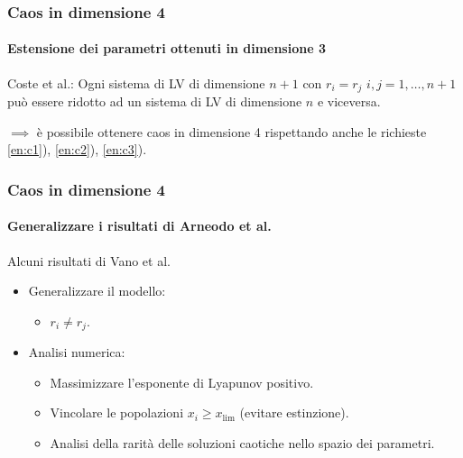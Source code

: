 \begin{frame}
\frametitle{Caos in dimensione 4}
\framesubtitle{Estensione dei parametri ottenuti in dimensione 3}
\begin{block}{Coste et al.:}
Ogni sistema di LV di dimensione $n+1$ con $r_i = r_j$ $i, j = 1, \ldots, n+1$ può essere ridotto ad un sistema di LV di dimensione $n$ e viceversa.
\end{block}
\vspace{1em}
$\implies$ è possibile ottenere caos in dimensione 4 rispettando anche le richieste \ref{en:c1}), \ref{en:c2}), \ref{en:c3}).
\end{frame}

\begin{frame}
\frametitle{Caos in dimensione 4}
\framesubtitle{Generalizzare i risultati di Arneodo et al.}
\begin{block}{Alcuni risultati di Vano et al.}
\begin{itemize}
    \item Generalizzare il modello:
	\begin{itemize}
	    \item $r_i \neq r_j$.
	\end{itemize}
    \item Analisi numerica:
	\begin{itemize}
	    \item Massimizzare l'esponente di Lyapunov positivo.
	    \item Vincolare le popolazioni $x_i \ge x_{\text{lim}}$ (evitare estinzione).
            \item Analisi della rarità delle soluzioni caotiche nello spazio dei parametri.
	\end{itemize}
\end{itemize}
\end{block}
\end{frame}

